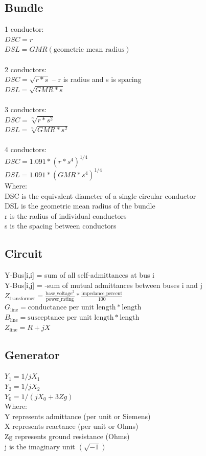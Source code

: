 \documentclass{article}
\begin{document}
	\subsection{Bundle}
	1 conductor: \\
	$DSC = r$ \\
	$DSL = GMR (\text{geometric mean radius})$ \\
	\\
	2 conductors: \\
	$DSC = \sqrt{r * s}$ -- r is radius and s is spacing \\
	$DSL = \sqrt{GMR * s}$ \\
	\\
	3 conductors: \\
	$DSC = \sqrt[n]{r * s^2}$ \\
	$DSL = \sqrt[n]{GMR * s^2}$ \\
	\\
	4 conductors: \\
	$DSC = 1.091 * (r * s^4)^{1/4}$ \\
	$DSL = 1.091 * (GMR * s^4)^{1/4}$ \\
	
	\noindent
	Where: \\
	DSC is the equivalent diameter of a single circular conductor \\
	DSL is the geometric mean radius of the bundle \\
	r is the radius of individual conductors \\
	s is the spacing between conductors 
	
	\subsection{Circuit}
	Y-Bus[i,i] = sum of all self-admittances at bus i \\
	Y-Bus[i,j] = -sum of mutual admittances between buses i and j \\
	\noindent
	$Z_{\text{transformer}} = \frac{\text{base\_voltage}^2}{\text{power\_rating}} * \frac{\text{impedance\_percent}}{100}$ \\
	$G_{\text{line}} = \text{conductance per unit length} * \text{length}$ \\
	$B_{\text{line}} = \text{susceptance per unit length} * \text{length}$ \\
	$Z_{\text{line}} = R + jX$
	
	\subsection{Generator}
	$Y_1 = 1/jX_1$ \\
	$Y_2 = 1/jX_2$ \\
	$Y_0 = 1/(jX_0 + 3Zg)$ \\
	\noindent
	Where: \\
	Y represents admittance (per unit or Siemens) \\
	X represents reactance (per unit or Ohms) \\
	Zg represents ground resistance (Ohms) \\
	j is the imaginary unit $(\sqrt{-1})$ 
	
\end{document}
